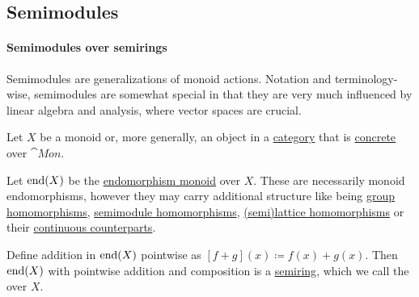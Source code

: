 \subsection{Semimodules}\label{subsec:semimodules}

\paragraph{Semimodules over semirings}

Semimodules are generalizations of monoid actions. Notation and terminology-wise, semimodules are somewhat special in that they are very much influenced by linear algebra and analysis, where vector spaces are crucial.

\begin{definition}\label{def:endomorphism_semiring}\mimprovised
  Let \( X \) be a monoid or, more generally, an object in a \hyperref[def:category]{category} that is \hyperref[def:concrete_category]{concrete} over \hyperref[def:monoid/category]{\( \cat{Mon} \)}.

  Let \( \operatorname{end}(X) \) be the \hyperref[def:endomorphism_monoid]{endomorphism monoid} over \( X \). These are necessarily monoid endomorphisms, however they may carry additional structure like being \hyperref[def:group/homomorphism]{group homomorphisms}, \hyperref[def:semimodule/homomorphism]{semimodule homomorphisms}, \hyperref[def:semilattice/homomorphism]{(semi)lattice homomorphisms} or their \hyperref[rem:topological_first_order_structures]{continuous counterparts}.

  Define addition in \( \operatorname{end}(X) \) pointwise as \( [f + g](x) \coloneqq f(x) + g(x) \). Then \( \operatorname{end}(X) \) with pointwise addition and composition is a \hyperref[def:semiring]{semiring}, which we call the  over \( X \).
\end{definition}

